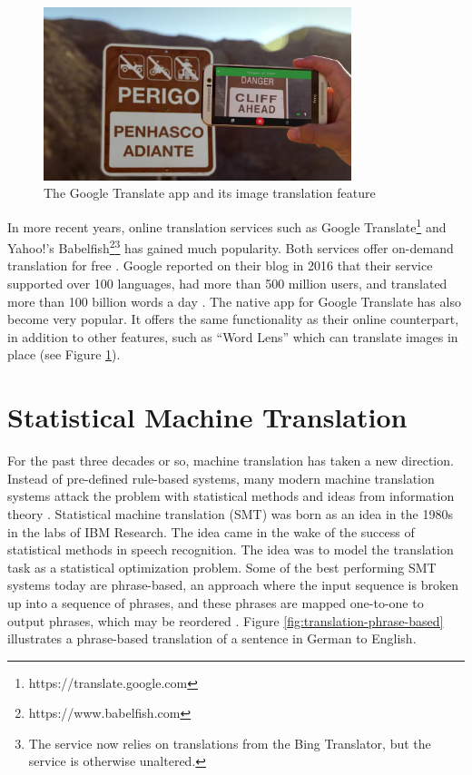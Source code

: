 \begin{figure}[ht]
    \centering
    \includegraphics[width=0.8\textwidth]{fig/background_theory/google_translate_rt.png}
    \caption{The Google Translate app and its image translation feature}
    \label{fig:google-translate-rt}
\end{figure}

In more recent years, online translation services such as Google Translate\footnote{https://translate.google.com} and Yahoo!'s Babelfish\footnote{https://www.babelfish.com}\footnote{The service now relies on translations from the Bing Translator, but the service is otherwise unaltered.} has gained much popularity. Both services offer on-demand translation for free \citep{schuster2016googletranslate, hutchins2007machine}. Google reported on their blog in 2016 that their service supported over 100 languages, had more than 500 million users, and translated more than 100 billion words a day \citep{turovsky2016googletranslate}. The native app for Google Translate has also become very popular. It offers the same functionality as their online counterpart, in addition to other features, such as ``Word Lens'' which can translate images in place (see Figure \ref{fig:google-translate-rt}).


\section{Statistical Machine Translation}
For the past three decades or so, machine translation has taken a new direction. Instead of pre-defined rule-based systems, many modern machine translation systems attack the problem with statistical methods and ideas from information theory \citep{brown1990statistical}. Statistical machine translation (SMT) was born as an idea in the 1980s in the labs of IBM Research. The idea came in the wake of the success of statistical methods in speech recognition. The idea was to model the translation task as a statistical optimization problem. Some of the best performing SMT systems today are phrase-based, an approach where the input sequence is broken up into a sequence of phrases, and these phrases are mapped one-to-one to output phrases, which may be reordered \citep[pp.~127--128]{koehn2010statistical}. Figure \ref{fig:translation-phrase-based} illustrates a phrase-based translation of a sentence in German to English.

